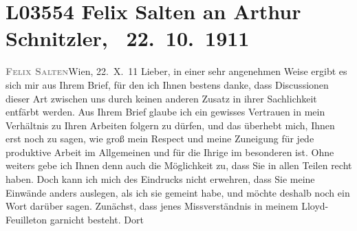 

\section[ Felix Salten an Arthur Schnitzler, 22. 10. 1911]{L03554 Felix Salten an Arthur Schnitzler,  22. 10. 1911}
\nopagebreak{}
\rehead{ }\normalsize\beginnumbering{}
\toendnotes[C]{\smallbreak\pagebreak[2]}
\toendnotes[C]{\smallbreak}
\toendnotes[C]{\smallbreak}
\pstart
           {\pb}\textcolor{gray}{\textbf{\textsc{Felix Salten}}}\hfill Wien, 22. X. 11\pend
           \vspace{0.5em}
\pstart
           Lieber, in einer sehr angenehmen Weise ergibt es sich mir aus Ihrem
               Brief, für den ich Ihnen bestens danke, dass Discussionen dieser Art zwischen uns
               durch keinen anderen Zusatz in ihrer Sachlichkeit entfärbt werden. Aus Ihrem Brief
               glaube ich ein gewisses Vertrauen in mein Verhältnis zu Ihren Arbeiten folgern zu
               dürfen, und das überhebt mich, Ihnen erst noch zu sagen, wie groß mein Respect und
               meine Zuneigung für jede produktive Arbeit im Allgemeinen und für die Ihrige im
               besonderen ist. Ohne weiters gebe ich Ihnen denn auch die Möglichkeit zu, dass Sie in
               allen Teilen recht haben. Doch kann ich mich des Eindrucks nicht erwehren, dass Sie
               meine Einwände anders auslegen, als ich sie gemeint habe, und möchte deshalb noch ein
               Wort darüber sagen. Zunächst, dass jenes Missverständnis in meinem Lloyd-Feuilleton garnicht besteht. Dort
